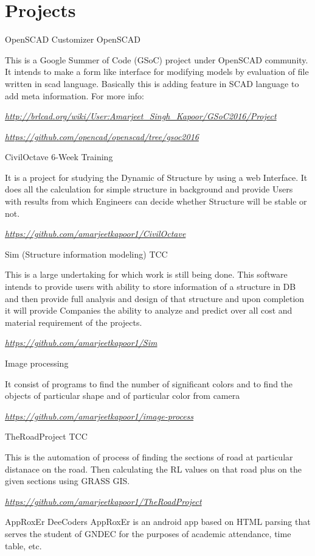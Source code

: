 \documentclass[]{friggeri-cv}
\begin{document}
\section{Projects}
\begin{entrylist}
  \entry
    {}
    {OpenSCAD Customizer}
    {OpenSCAD}
    {
        This is a Google Summer of Code (GSoC) project under OpenSCAD community. It
        intends to make a form like interface for modifying models by
        evaluation of file written in scad language. Basically this is
        adding feature in SCAD language to add meta information. For
        more info:
    
    
        \textit{\href{http://brlcad.org/wiki/User:Amarjeet_Singh_Kapoor/GSoC2016/Project}{http://brlcad.org/wiki/User:Amarjeet\_Singh\_Kapoor/GSoC2016/Project}}
        
        \textit{\href{https://github.com/openscad/openscad/tree/gsoc2016}{https://github.com/opencad/openscad/tree/gsoc2016}}
    }
  \entry
    {}
    {CivilOctave}
    {6-Week Training}
    {
        It is a project for studying the Dynamic of Structure by using a web
        Interface. It does all the calculation for simple structure in
        background and provide Users with results from which
        Engineers can decide whether Structure will be stable or not.
        
        
        \textit{\href{https://github.com/amarjeetkapoor1/CivilOctave}{https://github.com/amarjeetkapoor1/CivilOctave}}
    }
    \entry
    {}
    {Sim (Structure information modeling)}
    {TCC}
    {
        This is a large undertaking for which work is still being done.
        This software intends to provide users with ability to store
        information of a structure in DB and then provide full analysis
        and design of that structure and upon completion it will provide
        Companies the ability to analyze and predict over all cost and
        material requirement of the projects.
        
        \textit{\href{https://github.com/amarjeetkapoor1/Sim}{https://github.com/amarjeetkapoor1/Sim}}
    }
    \entry
    {}
    {Image processing}
    {}
    {
        It consist of programs to find the number of significant colors and to find the objects of particular shape and of particular
    color from camera
    
    
        \textit{\href{https://github.com/amarjeetkapoor1/image-process}{https://github.com/amarjeetkapoor1/image-process}}
    }
    
    \entry
    {}
    {TheRoadProject}
    {TCC}
    {
    This is the automation of process of finding the sections of road at particular distanace on the road. Then calculating the RL values on that road plus on the given sections using GRASS GIS.
    
    
    \textit{\href{https://github.com/amarjeetkapoor1/TheRoadProject}{ https://github.com/amarjeetkapoor1/TheRoadProject}
    }}
    
        \entry
    {}
    {AppRoxEr}
    {DeeCoders}
    {
     AppRoxEr is an android app based on HTML parsing that serves the student of GNDEC for the purposes of academic attendance, time table, etc.
    }
    
\end{entrylist}
\end{document}
